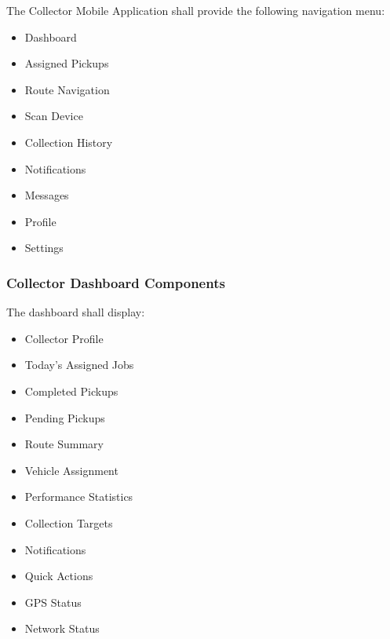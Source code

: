 The Collector Mobile Application shall provide the following navigation
menu:

\begin{itemize}

\item Dashboard

\item Assigned Pickups

\item Route Navigation

\item Scan Device

\item Collection History

\item Notifications

\item Messages

\item Profile

\item Settings

\end{itemize}


\subsubsection*{Collector Dashboard Components}

The dashboard shall display:

\begin{itemize}

\item Collector Profile

\item Today's Assigned Jobs

\item Completed Pickups

\item Pending Pickups

\item Route Summary

\item Vehicle Assignment

\item Performance Statistics

\item Collection Targets

\item Notifications

\item Quick Actions

\item GPS Status

\item Network Status

\end{itemize}

